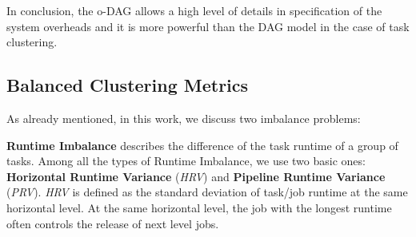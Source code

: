 In conclusion, the o-DAG allows a high level of details in specification of the system overheads and it is more powerful than the DAG model in the case of task clustering.





\subsection{Balanced Clustering Metrics}


As already mentioned, in this work, we discuss two imbalance problems:



\textbf{Runtime Imbalance} describes the difference of the task runtime of a group of tasks. Among all the types of Runtime Imbalance, we use two basic ones: \textbf{Horizontal Runtime Variance} ({\em HRV}) and \textbf{Pipeline Runtime Variance} ({\em PRV}). {\em HRV} is defined as the standard deviation of task/job runtime at the same horizontal level. At the same horizontal level, the job with the longest runtime often controls the release of next level jobs. 


